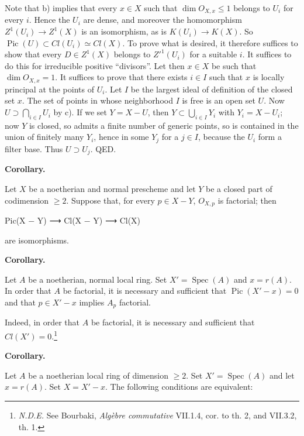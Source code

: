 \documentclass[
]{article}
\newenvironment{Shaded}{}{}
\newcommand{\NormalTok}[1]{#1}
\begin{document}
Note that b) implies that every \(x \in X\) such that
\(\dim O_{X,x} \leqslant 1\) belongs to \(U_{i}\) for every \(i\). Hence
the \(U_{i}\) are dense, and moreover the homomorphism
\(Z^{1}(U_{i}) \to Z^{1}(X)\) is an isomorphism, as is
\(K(U_{i}) \to K(X)\). So
\(\operatorname{Pic}(U) \subset Cl(U_{i}) \simeq Cl(X)\). To prove what
is desired, it therefore suffices to show that every \(D \in Z^{1}(X)\)
belongs to \(Z'^{1}(U_{i})\) for a suitable \(i\). It suffices to do
this for irreducible positive ``divisors''. Let then \(x \in X\) be such
that \(\dim O_{X,x} = 1\). It suffices to prove that there exists
\(i \in I\) such that \({x}\) is locally principal at the points of
\(U_{i}\). Let \(I\) be the largest ideal of definition of the closed
set \({x}\). The set of points in whose neighborhood \(I\) is free is an
open set \(U\). Now \(U \supset \bigcap_{i \in I} U_{i}\) by c). If we
set \(Y = X - U\), then \(Y \subset \bigcup_{i \in I} Y_{i}\) with
\(Y_{i} = X - U_{i}\); now \(Y\) is closed, so admits a finite number of
generic points, so is contained in the union of finitely many \(Y_{i}\),
hence in some \(Y_{j}\) for a \(j \in I\), because the \(U_{i}\) form a
filter base. Thus \(U \supset U_{j}\). QED.

\textbf{Corollary.}

Let \(X\) be a noetherian and normal prescheme and let \(Y\) be a closed
part of codimension \(\geqslant 2\). Suppose that, for every
\(p \in X - Y\), \(O_{X,p}\) is factorial; then

\begin{Shaded}
\begin{Highlighting}[]
\NormalTok{Pic(X − Y) ⟶ Cl(X − Y) ⟶ Cl(X)}
\end{Highlighting}
\end{Shaded}

are isomorphisms.

\textbf{Corollary.}

Let \(A\) be a noetherian, normal local ring. Set
\(X' = \operatorname{Spec}(A)\) and \(x = r(A)\). In order that \(A\) be
factorial, it is necessary and sufficient that
\(\operatorname{Pic}(X' - {x}) = 0\) and that \(p \in X' - {x}\) implies
\(A_{p}\) factorial.

Indeed, in order that \(A\) be factorial, it is necessary and sufficient
that \(Cl(X') = 0\).\footnote{\emph{N.D.E.} See Bourbaki, \emph{Algèbre
  commutative} VII.1.4, cor. to th. 2, and VII.3.2, th. 1.}

\textbf{Corollary.}

Let \(A\) be a noetherian local ring of dimension \(\geqslant 2\). Set
\(X' = \operatorname{Spec}(A)\) and let \(x = r(A)\). Set
\(X = X' - {x}\). The following conditions are equivalent:
\end{document}
